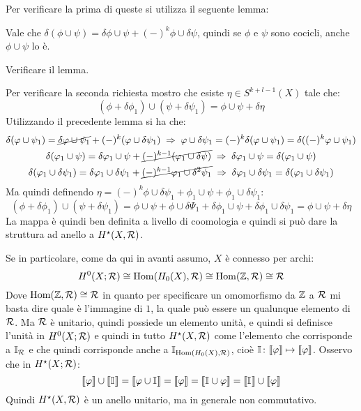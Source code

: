 Per verificare la prima di queste si utilizza il seguente lemma:
\begin{lemma}
  Vale che $ \delta(\phi \cup \psi) = \delta \phi \cup \psi + (-)^k \phi \cup \delta \psi $, quindi se $ \phi $ e $ \psi $ sono cocicli,
  anche $ \phi \cup \psi $ lo è.
\end{lemma}
\begin{exercise}
  Verificare il lemma.
\end{exercise}
Per verificare la seconda richiesta mostro che esiste $ \eta \in S^{k+l-1}(X) $ tale che:
\[
  (\phi + \delta\phi_1) \cup (\psi + \delta\psi_1) = \phi \cup \psi + \delta \eta
\]
Utilizzando il precedente lemma si ha che:
\begin{gather*}
  \delta(\phi \cup \psi_1) = \cancel{\delta \phi \cup \psi_1} + (-)^k (\phi \cup \delta\psi_1) \; \Rightarrow \; \phi \cup \delta \psi_1 = (-)^k \delta(\phi \cup \psi_1) = \delta ((-)^k \phi \cup \psi_1) \\
  \delta(\phi_1 \cup \psi) = \delta \phi_1 \cup \psi + \cancel{(-)^{k-1}(\phi_1 \cup \delta \psi)} \; \Rightarrow \; \delta \phi_1 \cup \psi = \delta(\phi_1 \cup \psi) \\
  \delta(\phi_1 \cup \delta \psi_1) = \delta \phi_1 \cup \delta \psi_1 + \cancel{(-)^{k-1}\phi_1 \cup \delta^2 \psi_1} \; \Rightarrow \; \delta \phi_1 \cup \delta \psi_1  =  \delta(\phi_1 \cup \delta \psi_1)
\end{gather*}
Ma quindi definendo $ \eta = (-)^k \phi \cup \delta \psi_1 + \phi_1 \cup \psi + \phi_1 \cup \delta \psi_1 $:
\[
  (\phi + \delta \phi_1) \cup (\psi + \delta \psi_1) = \phi \cup \psi + \phi \cup \delta \Psi_1 + \delta \phi_1 \cup \psi + \delta \phi_1 \cup \delta \psi_1 = \phi \cup \psi + \delta \eta
\]
La mappa è quindi ben definita a livello di coomologia e quindi si può dare la struttura
ad anello a $ H^\star(X,\R) $.

Se in particolare, come da qui in avanti assumo, $ X $ è connesso per archi:
\[
  H^0(X; \R) \cong \hom{H_0(X), \R} \cong \hom{\Z, \R} \cong \R
\]
Dove $ \hom{\Z, \R} \cong \R $ in quanto per specificare un omomorfismo da
$ \Z $ a $ \R $ mi basta dire quale è l'immagine di $ 1 $, la quale può essere
un qualunque elemento di $ \R $. Ma $ \R $ è unitario, quindi possiede un
elemento unità, e quindi si definisce l'unità in $ H^0(X; \R) $ e quindi in
tutto $ H^\star(X, \R) $ come l'elemento che corrisponde a $ \Id{\R} $ e che quindi
corrisponde anche a $ \Id{\hom{H_0(X), \R}} $, cioè $ \Id{} \colon \llbracket \phi \rrbracket \mapsto \llbracket \phi \rrbracket $.
Osservo che in $ H^\star(X; \R) $:
\[
  \llbracket \phi \rrbracket \cup \llbracket \Id{} \rrbracket = \llbracket \phi \cup \Id{} \rrbracket = \llbracket \phi \rrbracket = \llbracket \Id{} \cup \phi \rrbracket = \llbracket \Id{} \rrbracket \cup \llbracket \phi \rrbracket
\]
Quindi $ H^\star(X, \R) $ è un anello unitario, ma in generale non commutativo.

